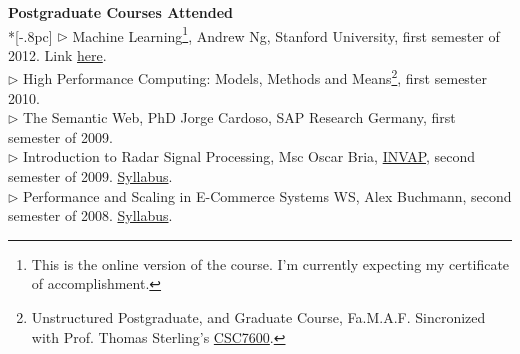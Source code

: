 \documentclass[a4paper,11pt,english]{article}
\begin{document}
{\large \bf Postgraduate Courses Attended}\\ *[-.8pc]
\underline{\hspace{6in}}
$\triangleright$ Machine Learning\footnote{This is the online version of the course. I'm currently expecting my certificate of accomplishment.}, Andrew Ng, Stanford University, first semester of 2012. Link \href{http://www.ml-class.org}{here}. \\
$\triangleright$ High Performance Computing: Models, Methods and Means\footnote{Unstructured Postgraduate,
and Graduate Course, Fa.M.A.F. Sincronized with Prof. Thomas Sterling's 
\href{http://www.csc.lsu.edu/Internal_review/2009/Syllabus_CSC_7600_HPC_2008.pdf}{CSC7600}.}, first semester 2010.\\
$\triangleright$ The Semantic Web, PhD Jorge Cardoso, SAP Research Germany, first semester of 2009.\\
$\triangleright$ Introduction to Radar Signal Processing, Msc Oscar Bria, 
\href{http://www.invap.net/index-e.php}{INVAP}, second semester of 2009. \href{http://postgrado.info.unlp.edu.ar/Cursos/Cursos/11-2011_Introduccion_al_Procesamiento_de_Senales_Radar.pdf}{Syllabus}.\\
$\triangleright$ Performance and Scaling in E-Commerce Systems WS, Alex Buchmann, second semester of 2008. 
\href{http://www.dvs.tu-darmstadt.de/teaching/perf/2008/}{Syllabus}.\\
\end{document}
